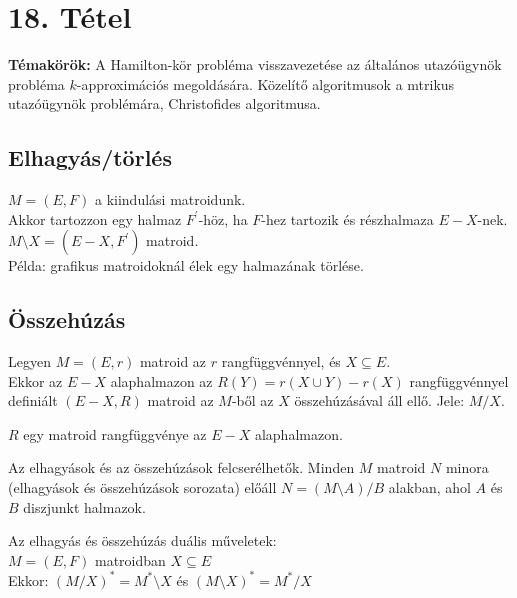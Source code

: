 
\setcounter{chapter}{18}
\chapter*{18. Tétel}

\textbf{Témakörök:} A Hamilton-kör probléma visszavezetése az általános utazóügynök probléma $k$-approximációs megoldására. Közelítő algoritmusok a mtrikus utazóügynök problémára, Christofides algoritmusa.

\noindent\hrulefill

\section*{Elhagyás/törlés}
$M=(E,F)$ a kiindulási matroidunk.\\
Akkor tartozzon egy halmaz $F^{'}$-höz, ha $F$-hez tartozik és részhalmaza $E-X$-nek.\\
$M\setminus X=(E-X,F^{'})$ matroid.\\
Példa: grafikus matroidoknál élek egy halmazának törlése.

\section*{Összehúzás}
Legyen $M=(E,r)$ matroid az $r$ rangfüggvénnyel, és $X\subseteq E$.\\
Ekkor az $E-X$ alaphalmazon az $R(Y)=r(X\cup Y)-r(X)$ rangfüggvénnyel definiált $(E-X,R)$ matroid az $M$-ből az $X$ összehúzásával áll ellő. Jele: $M/X$.

\begin{lem}
$R$ egy matroid rangfüggvénye az $E-X$ alaphalmazon.
\end{lem}

\begin{theo}
Az elhagyások és az összehúzások felcserélhetők. Minden $M$ matroid $N$ minora (elhagyások és összehúzások sorozata) előáll $N=(M\setminus A)/B$ alakban, ahol $A$ és $B$ diszjunkt halmazok.
\end{theo}

\begin{theo}
Az elhagyás és összehúzás duális műveletek:\\
$M=(E,F)$ matroidban $X\subseteq E$\\
Ekkor: $(M/X)^{*}=M^{*}\setminus X$ és $(M\setminus X)^{*}=M^{*}/X$
\end{theo}

